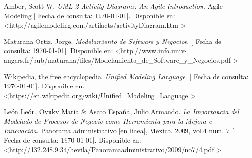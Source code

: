 \documentclass[spanish,12pt,letterpapper]{article}
\begin{document}
	\pagebreak
	\begin{thebibliography}{9}
	 Amber, Scott W. 
		\emph{UML 2 Activity Diagrams: An Agile Introduction}. Agile Modeling {[} Fecha de consulta: \today {]}. Disponible en: \textless http://agilemodeling.com/artifacts/activityDiagram.htm \textgreater	
	
		 Maturana Ortiz, Jorge. 
		\emph{Modelamiento de Software y Negocios}. {[} Fecha de consulta: \today {]}. Disponible en: \textless http://www.info.univ-angers.fr/pub/maturana/files/Modelamiento\_de\_Software\_y\_Negocios.pdf \textgreater
		
		 Wikipedia, the free encyclopedia. 
		\emph{Unified Modeling Language}. {[} Fecha de consulta: \today {]}. Disponible en: \textless https://en.wikipedia.org/wiki/Unified\_Modeling\_Language \textgreater
		
		 León León, Oyuky María \& Asato España, Julio Armando. 
		\emph{La Importancia del Modelado de Procesos de
			Negocio como Herramienta para la Mejora e
			Innovación}. Panorama administrativo {[}en linea{]}, México. 2009, vol.4 num. 7  {[} Fecha de consulta: \today {]}. Disponible en: \textless http://132.248.9.34/hevila/Panoramaadministrativo/2009/no7/4.pdf \textgreater
	\end{thebibliography}
\end{document}
